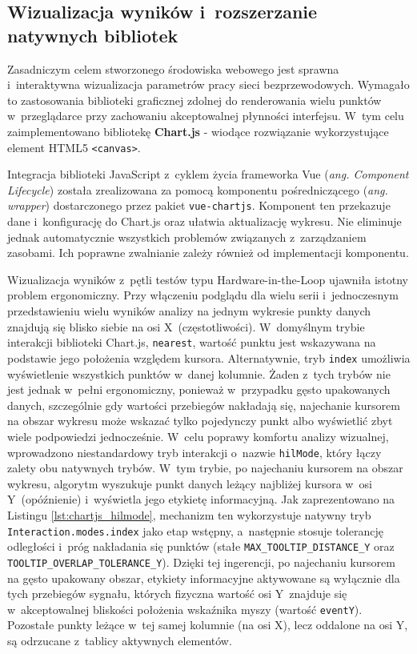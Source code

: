 \subsection{Wizualizacja wyników i~rozszerzanie natywnych bibliotek}
\label{subsec:wizualizacja-wynikow-i-rozszerzanie-natywnych-bibliotek}

Zasadniczym celem stworzonego środowiska webowego jest sprawna i~interaktywna wizualizacja parametrów pracy sieci bezprzewodowych.
Wymagało to zastosowania biblioteki graficznej zdolnej do renderowania wielu punktów w~przeglądarce przy zachowaniu akceptowalnej płynności interfejsu.
W~tym celu zaimplementowano bibliotekę \textbf{Chart.js} \cite{chartjs_documentation} - wiodące rozwiązanie wykorzystujące element HTML5 \texttt{<canvas>}.

Integracja biblioteki JavaScript z~cyklem życia frameworka Vue (\textit{ang. Component Lifecycle}) została zrealizowana za pomocą komponentu pośredniczącego (\textit{ang. wrapper}) dostarczonego przez pakiet \texttt{vue-chartjs}.
Komponent ten przekazuje dane i~konfigurację do Chart.js oraz ułatwia aktualizację wykresu.
Nie eliminuje jednak automatycznie wszystkich problemów związanych z~zarządzaniem zasobami.
Ich poprawne zwalnianie zależy również od implementacji komponentu.

Wizualizacja wyników z~pętli testów typu Hardware-in-the-Loop ujawniła istotny problem ergonomiczny.
Przy włączeniu podglądu dla wielu serii i~jednoczesnym przedstawieniu wielu wyników analizy na jednym wykresie punkty danych znajdują się blisko siebie na osi X~(częstotliwości).
W~domyślnym trybie interakcji biblioteki Chart.js, \texttt{nearest}, wartość punktu jest wskazywana na podstawie jego położenia względem kursora.
Alternatywnie, tryb \texttt{index} umożliwia wyświetlenie wszystkich punktów w~danej kolumnie.
Żaden z~tych trybów nie jest jednak w~pełni ergonomiczny, ponieważ w~przypadku gęsto upakowanych danych, szczególnie gdy wartości przebiegów nakładają się, najechanie kursorem na obszar wykresu może wskazać tylko pojedynczy punkt albo wyświetlić zbyt wiele podpowiedzi jednocześnie.
W~celu poprawy komfortu analizy wizualnej, wprowadzono niestandardowy tryb interakcji o~nazwie \texttt{hilMode}, który łączy zalety obu natywnych trybów.
W~tym trybie, po najechaniu kursorem na obszar wykresu, algorytm wyszukuje punkt danych leżący najbliżej kursora w~osi Y~(opóźnienie) i~wyświetla jego etykietę informacyjną.
Jak zaprezentowano na Listingu \ref{lst:chartjs_hilmode}, mechanizm ten wykorzystuje natywny tryb \texttt{Interaction.modes.index} jako etap wstępny, a~następnie stosuje tolerancję odległości i~próg nakładania się punktów (stałe \texttt{MAX\_TOOLTIP\_DISTANCE\_Y} oraz \texttt{TOOLTIP\_OVERLAP\_TOLERANCE\_Y}).
Dzięki tej ingerencji, po najechaniu kursorem na gęsto upakowany obszar, etykiety informacyjne aktywowane są wyłącznie dla tych przebiegów sygnału, których fizyczna wartość osi Y~znajduje się w~akceptowalnej bliskości położenia wskaźnika myszy (wartość \texttt{eventY}).
Pozostałe punkty leżące w~tej samej kolumnie (na osi X), lecz oddalone na osi Y, są odrzucane z~tablicy aktywnych elementów.

